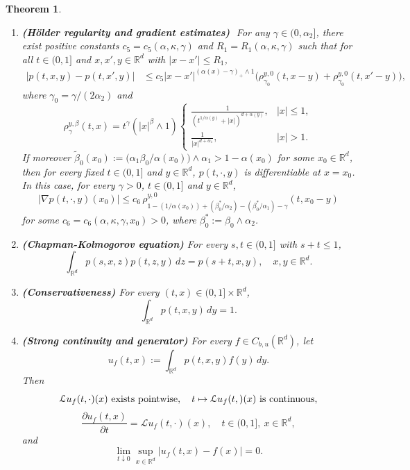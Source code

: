 \documentclass[a4paper,11pt]{amsart}
\renewcommand{\le}{\leqslant}
\newcommand{\R}{\mathds R}
\newcommand{\B}{\beta}
\newcommand{\K}{\kappa}
\newcommand{\A}{\alpha}
\newcommand{\G}{\gamma}
\def\LL{{\mathcal L}}
\newtheorem{theorem}{Theorem}[section]
\theoremstyle{definition}
\begin{document}
\begin{theorem}
\begin{enumerate}
\item[(ii)]{\bf (H\"{o}lder regularity and gradient estimates)}\,\,
For any
$\G \in (0, \alpha_2]$,
 there exist positive constants
$c_5 =c_5(\A,\K,\G)$ and $R_1=R_1(\A,\K,\G)$ such that for all $t \in (0,1]$ and $x, x', y \in \R^d$ with $|x-x'|\le R_1$,
\begin{equation}\label{t1-1-7}
\begin{split}
 \big|p(t,x,y)-p(t,x', y)\big|
&\le c_5
|x-x'|^{(\A(x)-\G)_+\wedge 1}
\big(\rho^{y,0}_{\gamma_0}(t,x-y)+\rho^{y,0}_{\gamma_0}(t,x'-y)\big),
\end{split}
\end{equation}
where $\gamma_0= {\G/(2\A_2)}$ and
 \begin{equation}\label{e3-0}
\rho_{\G}^{y,\beta}(t,x)=t^{\G}(|x|^{\beta}\wedge 1)
\begin{cases}
\frac{1}{(t^{{1/\A(y)}}+|x|)^{d+\A(y)}},&  |x|\le 1,\\
\frac{1}{|x|^{d+\A_1}},& |x|> 1.
\end{cases}
\end{equation}
If moreover $\tilde \B_0(x_0):=\big({\A_1\B_0}/{\A(x_0)})\wedge \A_1>1-\A(x_0)$ for some $x_0 \in \R^d$, then for every fixed $t \in (0,1]$ and $y \in \R^d$,
$p(t,\cdot,y)$ is differentiable at $x=x_0$.
In this case,
for every $\G>0$, $t\in(0,1]$ and $ y\in \R^d$,
\begin{equation}\label{t1-1-7a}
|\nabla p(t,\cdot,y)(x_0)|\le c_6 \, \rho^{y,0}_{1-({1/\A(x_0)})+
(\B_0^*/\A_2)-(\B_0^*/\A_1)-\G}(t,x_0-y)
\end{equation}
  for some $c_6 =c_6(\A,\K,\G,x_0)>0$, where $\B_0^*:=\B_0 \wedge\A_2$.


\item[(iii)]{\bf (Chapman-Kolmogorov equation)} For every $s,t \in (0,1]$ with $s+t\le 1$,
\begin{equation}\label{t1-1-5}
\int_{\R^d}p(s,x,z)p(t,z,y)\,dz=p(s+t,x,y),\quad x,y\in \R^d.
\end{equation}

\item[(iv)]{\bf (Conservativeness)} For every $(t,x)\in (0,1]\times \R^d$,
\begin{equation}\label{t1-1-6}
\int_{\R^d}p(t,x,y)\,dy=1.
\end{equation}

\item[(v)] {\bf (Strong continuity and generator)}
For every $f \in C_{b,u}(\R^d)$, let
$$u_f(t,x):=\int_{\R^d}p(t,x,y)f(y)\,dy.$$
Then
\begin{equation}\label{t1-1-2a}
\LL u_f (t, \cdot) (x) \hbox{ exists pointwise}, \quad t \mapsto \LL u_f (t, ) (x)
\hbox{  is continuous},
\end{equation}
\begin{equation}\label{t1-1-2}
\frac{\partial u_f(t,x)}{\partial t}
= \LL u_f(t,\cdot)(x),
\quad  t\in (0,1],\ x \in \R^d,
\end{equation}
and
\begin{equation}\label{t1-1-3}
\lim_{t \downarrow 0}\sup_{x \in \R^d}|u_f(t,x)-f(x)|=0.
\end{equation}


\end{enumerate}
\end{theorem}
\end{document}
